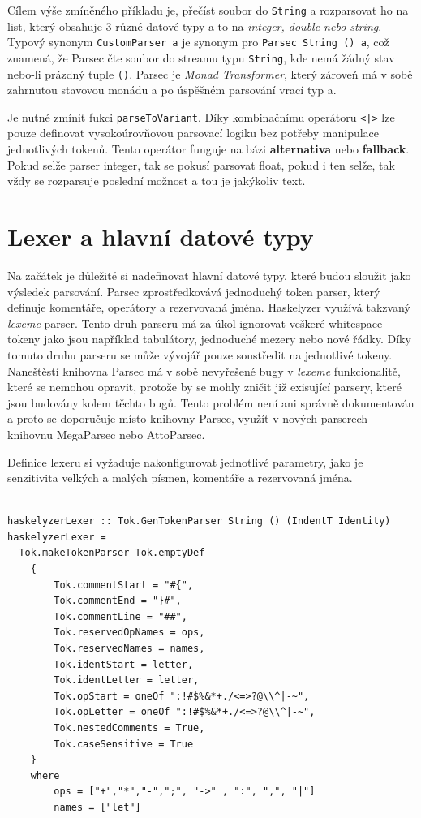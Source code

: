 \documentclass[male,czech]{kithesis}
\newcommand{\haskellInline}[1]{\colorbox{gray!10}{\texttt{#1}}}
\begin{document}
Cílem výše zmíněného příkladu je, 
přečíst soubor do \haskellInline{String} 
a rozparsovat ho na list, 
který obsahuje 3 různé datové typy 
a to na \textit{integer, double nebo string}.
Typový synonym \haskellInline{CustomParser a} 
je synonym pro \haskellInline{Parsec String () a},
což znamená, 
že Parsec čte soubor do streamu typu \haskellInline{String}, 
kde nemá žádný stav nebo-li prázdný tuple \haskellInline{()}. 
Parsec je \textit{Monad Transformer},
který zároveň má v sobě zahrnutou stavovou monádu a 
po úspěšném parsování vrací typ a. 

Je nutné zmínit fukci \haskellInline{parseToVariant}. 
Díky kombinačnímu operátoru \haskellInline{<|>} 
lze pouze definovat vysokoúrovňovou parsovací logiku bez potřeby manipulace jednotlivých tokenů. 
Tento operátor funguje na bázi \textbf{alternativa} nebo
\textbf{fallback}. 
Pokud selže parser integer, 
tak se pokusí parsovat float, 
pokud i ten selže, 
tak vždy se rozparsuje poslední možnost a 
tou je jakýkoliv text.

\section{Lexer a hlavní datové typy}

Na začátek je důležité si nadefinovat hlavní datové typy, 
které budou sloužit jako výsledek parsování.
Parsec zprostředkovává jednoduchý token parser, 
který definuje komentáře, 
operátory a rezervovaná jména.
Haskelyzer využívá takzvaný \textit{lexeme} parser.
Tento druh parseru má za úkol ignorovat veškeré whitespace tokeny jako
jsou například tabulátory, 
jednoduché mezery nebo nové řádky.
Díky tomuto druhu parseru se může vývojář pouze soustředit na 
jednotlivé tokeny. 
Naneštěstí knihovna Parsec má v sobě nevyřešené bugy v \textit{lexeme} funkcionalitě, 
které se nemohou opravit, 
protože by se mohly zničit již exisující parsery,
které jsou budovány kolem těchto bugů.
Tento problém není ani správně dokumentován a 
proto se doporučuje místo knihovny Parsec, 
využít v nových parserech knihovnu MegaParsec nebo AttoParsec. 

Definice lexeru si vyžaduje nakonfigurovat jednotlivé parametry,
jako je senzitivita velkých a malých písmen, 
komentáře a rezervovaná jména.

\begin{verbatim}

haskelyzerLexer :: Tok.GenTokenParser String () (IndentT Identity)
haskelyzerLexer =
  Tok.makeTokenParser Tok.emptyDef 
    { 
        Tok.commentStart = "#{",
        Tok.commentEnd = "}#",
        Tok.commentLine = "##",
        Tok.reservedOpNames = ops,
        Tok.reservedNames = names,
        Tok.identStart = letter,
        Tok.identLetter = letter,
        Tok.opStart = oneOf ":!#$%&*+./<=>?@\\^|-~",
        Tok.opLetter = oneOf ":!#$%&*+./<=>?@\\^|-~",
        Tok.nestedComments = True,
        Tok.caseSensitive = True
    }
    where
        ops = ["+","*","-",";", "->" , ":", ",", "|"]
        names = ["let"]

\end{verbatim}
\end{document}
